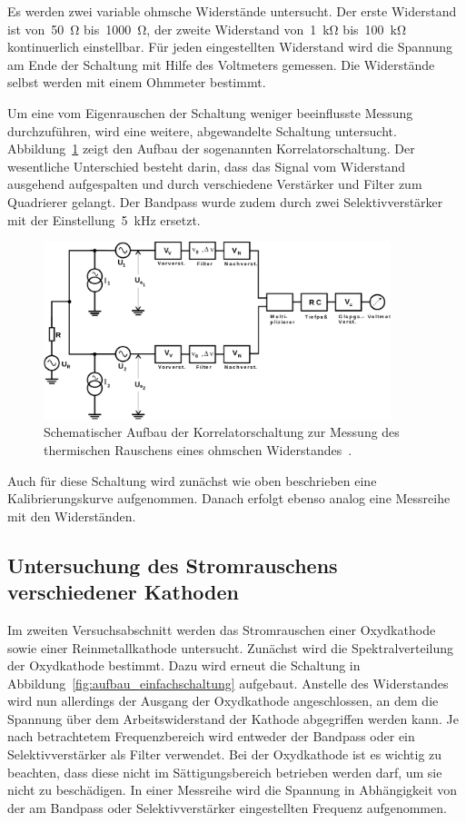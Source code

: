 Es werden zwei variable ohmsche Widerstände untersucht. Der erste Widerstand ist
von~\SI{50}{\ohm} bis~\SI{1000}{\ohm}, der zweite Widerstand
von~\SI{1}{\kilo\ohm} bis~\SI{100}{\kilo\ohm} kontinuerlich einstellbar. Für
jeden eingestellten Widerstand wird die Spannung am Ende der Schaltung mit Hilfe
des Voltmeters gemessen. Die Widerstände selbst werden mit einem Ohmmeter
bestimmt.

Um eine vom Eigenrauschen der Schaltung weniger beeinflusste Messung durchzuführen, wird eine weitere, abgewandelte Schaltung untersucht.
Abbildung~\ref{fig:aufbau_korrelatorschaltung} zeigt den Aufbau der sogenannten
Korrelatorschaltung. Der wesentliche Unterschied besteht darin, dass das Signal
vom Widerstand ausgehend aufgespalten und durch verschiedene Verstärker und
Filter zum Quadrierer gelangt. Der Bandpass wurde zudem durch zwei
Selektivverstärker mit der Einstellung~\SI{5}{\kilo\hertz} ersetzt.

\begin{figure}
  \centering
  \includegraphics[width=0.9\textwidth]{figures/aufbau_korrelatorschaltung.pdf}
  \caption{Schematischer Aufbau der Korrelatorschaltung zur Messung des
  thermischen Rauschens eines ohmschen Widerstandes~\cite{V57}.}
  \label{fig:aufbau_korrelatorschaltung}
\end{figure}

Auch für diese Schaltung wird zunächst wie oben beschrieben eine
Kalibrierungskurve aufgenommen. Danach erfolgt ebenso analog eine Messreihe mit
den Widerständen.

\subsection{Untersuchung des Stromrauschens verschiedener Kathoden}

Im zweiten Versuchsabschnitt werden das Stromrauschen einer Oxydkathode sowie
einer Reinmetallkathode untersucht. Zunächst wird die Spektralverteilung der
Oxydkathode bestimmt. Dazu wird erneut die Schaltung in
Abbildung~\ref{fig:aufbau_einfachschaltung} aufgebaut. Anstelle des Widerstandes
wird nun allerdings der Ausgang der Oxydkathode angeschlossen, an dem die
Spannung über dem Arbeitswiderstand der Kathode abgegriffen werden kann. Je nach
betrachtetem Frequenzbereich wird entweder der Bandpass oder ein
Selektivverstärker als Filter verwendet. Bei der Oxydkathode ist es wichtig zu
beachten, dass diese nicht im Sättigungsbereich betrieben werden darf, um sie
nicht zu beschädigen. In einer Messreihe wird die Spannung in Abhängigkeit von
der am Bandpass oder Selektivverstärker eingestellten Frequenz aufgenommen.

